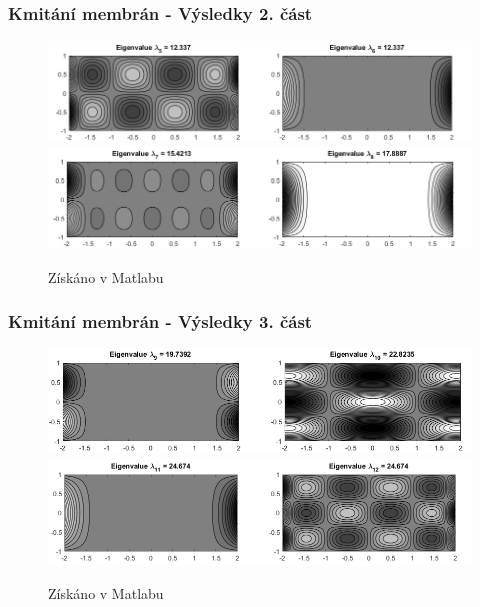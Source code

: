 \documentclass{beamer}
\begin{document}
\begin{frame}
\frametitle{Kmitání membrán - Výsledky 2. část}
\centering
\begin{figure}
\includegraphics[width=1\linewidth]{obdelnicky3.png}
\includegraphics[width=1\linewidth]{obdelnicky4.png}
\caption{Získáno v Matlabu}
\end{figure}
\end{frame}

\begin{frame}
\frametitle{Kmitání membrán - Výsledky 3. část}
\centering
\begin{figure}
\includegraphics[width=1\linewidth]{obdelnicky5.png}
\includegraphics[width=1\linewidth]{obdelnicky6.png}
\caption{Získáno v Matlabu}
\end{figure}
\end{frame}
\end{document}
